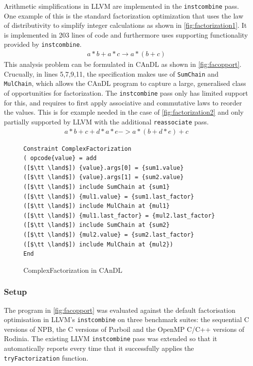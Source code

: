     Arithmetic simplifications in LLVM are implemented in the
    \texttt{instcombine} pass.
    One example of this is the standard factorization optimization that uses the
    law of distributivity to simplify integer calculations as shown in
    \autoref{fig:factorization1}.
    It is implemented in 203 lines of code and furthermore uses supporting
    functionality provided by \texttt{instcombine}.
    \begin{align}
        a*b+a*c\rightarrow a*(b+c)
        \label{fig:factorization1}
    \end{align}
    This analysis problem can be formulated in CAnDL as shown in
    \autoref{fig:facopport}.
    Crucually, in lines 5,7,9,11, the specification makes use of
    \texttt{SumChain} and \texttt{MulChain}, which allows the CAnDL program
    to capture a large, generalised class of opportunities for factorization.
    The \texttt{instcombine} pass only has limited support for this, and
    requires to first apply associative and commutative laws to reorder the
    values.
    This is for example needed in the case of \autoref{fig:factorization2} and
    only partially supported by LLVM with the additional \texttt{reassociate}
    pass.
    \begin{align}
        a*b+c+d*a*e->a*(b+d*e)+c
        \label{fig:factorization2}
    \end{align}

\begin{figure}[t]
\begin{lstlisting}[language=CAnDL]
Constraint ComplexFactorization
( opcode{value} = add
([$\tt \land$]) {value}.args[0] = {sum1.value}
([$\tt \land$]) {value}.args[1] = {sum2.value}
([$\tt \land$]) include SumChain at {sum1}
([$\tt \land$]) {mul1.value} = {sum1.last_factor}
([$\tt \land$]) include MulChain at {mul1}
([$\tt \land$]) {mul1.last_factor} = {mul2.last_factor}
([$\tt \land$]) include SumChain at {sum2}
([$\tt \land$]) {mul2.value} = {sum2.last_factor}
([$\tt \land$]) include MulChain at {mul2})
End
\end{lstlisting}
\vspace{-0.3cm}
\caption{ComplexFactorization in CAnDL}
\label{fig:facopport}
\end{figure}

\subsubsection{Setup}

    The program in \autoref{fig:facopport} was evaluated against the default
    factorisation optimisation in LLVM's \texttt{instcombine} on three benchmark
    suites: the sequential C versions of NPB, the C versions of Parboil and the
    OpenMP C/C++ versions of Rodinia.
    The existing LLVM \texttt{instcombine} pass was extended so that it
    automatically reports every time that it successfully applies the
    \texttt{tryFactorization} function.  

